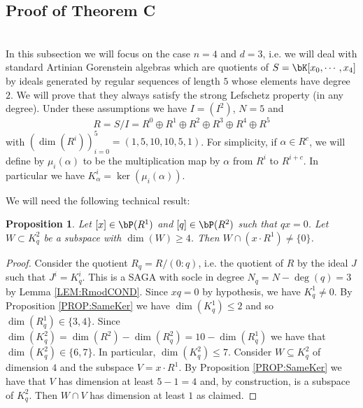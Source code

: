\documentclass[a4paper,11pt]{amsart}
\newtheorem{proposition}[theorem]{Proposition}
\begin{document}

\subsection{Proof of Theorem C}
$\,$\\

\noindent In this subsection we will focus on the case $n=4$ and $d=3$, i.e. we will deal with standard Artinian Gorenstein algebras which are quotients of $S=\bK[x_0,\cdots,x_4]$ by ideals generated by regular sequences of length $5$ whose elements have degree $2$. We will prove that they always satisfy the strong Lefschetz property (in any degree). Under these assumptions we have $I=(I^2)$, $N=5$ and 
$$R=S/I=R^0\oplus R^1\oplus R^2\oplus R^3\oplus R^4\oplus R^5$$ with $(\dim(R^i))_{i=0}^5=(1,5,10,10,5,1)$. 
For simplicity, if $\alpha\in R^c$, we will define by $\mu_i(\alpha)$ to be the multiplication map by $\alpha$ from $R^i$ to $R^{i+c}$. In particular we have $K^i_{\alpha}=\ker(\mu_i(\alpha))$.

We will need the following technical result:

\begin{proposition} 
\label{PROP:techprop}
Let $[x]\in \bP(R^1) $ and $[q]\in \bP(R^2)$ such that $qx=0$. Let $W\subset K^2_q$ be a subspace with $\dim(W)\geq 4$. Then $W\cap (x\cdot R^1)\neq \{0\}$. 
\end{proposition}

\begin{proof} 
Consider the quotient $R_q=R/(0:q)$, i.e. the quotient of $R$ by the ideal $J$ such that $J^i=K^i_q$. This is a SAGA with socle in degree $N_q=N-\deg(q)=3$ by Lemma \ref{LEM:RmodCOND}. Since $xq=0$ by hypothesis, we have $K^1_q\neq 0$. By Proposition \ref{PROP:SameKer} we have $\dim(K^1_q)\leq 2$ and so $\dim(R_q^1)\in \{3,4\}$.
Since $\dim(K^2_q)=\dim(R^2)-\dim(R^2_q)=10-\dim(R^1_q)$
we have that $\dim(K^2_q)\in \{6,7\}$. In particular, $\dim(K^2_q)\leq 7$.
Consider $W\subseteq K^2_q$ of dimension $4$ and the subspace $V=x\cdot R^1$. By Proposition \ref{PROP:SameKer} we have that $V$ has dimension at least $5-1=4$ and, by construction, is a subspace of $K^2_q$. Then $W\cap V$ has dimension at least $1$ as claimed.
\end{proof}
\end{document}
